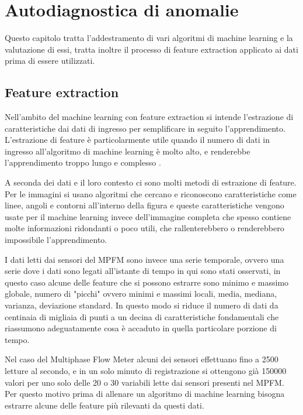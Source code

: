 \chapter{Autodiagnostica di anomalie}
\label{AutodiagnosticaDiAnomalie}

Questo capitolo tratta l'addestramento di vari algoritmi di machine learning e la valutazione di essi, tratta inoltre il processo di feature extraction applicato ai dati prima di essere utilizzati.

\section{Feature extraction}
Nell'ambito del machine learning con feature extraction si intende l'estrazione di caratteristiche dai dati di ingresso per semplificare in seguito l'apprendimento.
L'estrazione di feature è particolarmente utile quando il numero di dati in ingresso all'algoritmo di machine learning è molto alto, e renderebbe l'apprendimento troppo lungo e complesso \cite{FeatureExtraction}.

A seconda dei dati e il loro contesto ci sono molti metodi di estrazione di feature. Per le immagini si usano algoritmi che cercano e riconoscono caratteristiche come linee, angoli e contorni all'interno della figura e queste caratteristiche vengono usate per il machine learning invece dell'immagine completa che spesso contiene molte informazioni ridondanti o poco utili, che rallenterebbero o renderebbero impossibile l'apprendimento.

I dati letti dai sensori del MPFM sono invece una serie temporale, ovvero una serie dove i dati sono legati all'istante di tempo in qui sono stati osservati, in questo caso alcune delle feature che si possono estrarre sono minimo e massimo globale, numero di "picchi" ovvero minimi e massimi locali, media, mediana, varianza, deviazione standard. In questo modo si riduce il numero di dati da centinaia di migliaia di punti a un decina di caratteristiche fondamentali che riassumono adeguatamente cosa è accaduto in quella particolare porzione di tempo.  

Nel caso del Multiphase Flow Meter alcuni dei sensori effettuano fino a 2500 letture al secondo, e in un solo minuto di registrazione si ottengono già 150000 valori per uno solo delle 20 o 30 variabili lette dai sensori presenti nel MPFM. Per questo motivo prima di allenare un algoritmo di machine learning bisogna estrarre alcune delle feature più rilevanti da questi dati. 

